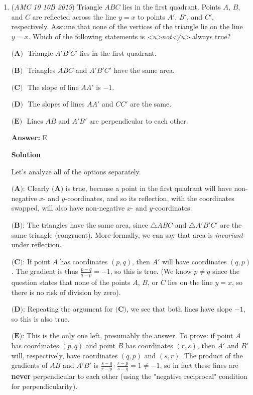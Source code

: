 \begin{enumerate}
 


	\item (\textit{AMC 10 10B 2019}) Triangle $ABC$ lies in the first quadrant. Points $A$, $B$, and $C$ are reflected across the line $y=x$ to points $A'$, $B'$, and $C'$, respectively. Assume that none of the vertices of the triangle lie on the line $y=x$. Which of the following statements is \textit{<u>not</u>} always true?


 $\textbf{(A) }$ Triangle $A'B'C'$ lies in the first quadrant.


 $\textbf{(B) }$ Triangles $ABC$ and $A'B'C'$ have the same area.


 $\textbf{(C) }$ The slope of line $AA'$ is $-1$.


 $\textbf{(D) }$ The slopes of lines $AA'$ and $CC'$ are the same.


 $\textbf{(E) }$ Lines $AB$ and $A'B'$ are perpendicular to each other.


 
 \textbf{Answer: }E



\textbf{Solution}

Let's analyze all of the options separately. 

 $\textbf{(A)}$: Clearly $\textbf{(A)}$ is true, because a point in the first quadrant will have non-negative $x$- and $y$-coordinates, and so its reflection, with the coordinates swapped, will also have non-negative $x$- and $y$-coordinates.

 $\textbf{(B)}$: The triangles have the same area, since $\triangle ABC$ and $\triangle A'B'C'$ are the same triangle (congruent). More formally, we can say that area is \textit{invariant} under reflection.

 $\textbf{(C)}$: If point $A$ has coordinates $(p,q)$, then $A'$ will have coordinates $(q,p)$. The gradient is thus $\frac{p-q}{q-p} = -1$, so this is true. (We know $p \neq q$ since the question states that none of the points $A$, $B$, or $C$ lies on the line $y=x$, so there is no risk of division by zero).

 $\textbf{(D)}$: Repeating the argument for $\textbf{(C)}$, we see that both lines have slope $-1$, so this is also true.

 $\textbf{(E)}$: This is the only one left, presumably the answer. To prove: if point $A$ has coordinates $(p,q)$ and point $B$ has coordinates $(r,s)$, then $A'$ and $B'$ will, respectively, have coordinates $(q,p)$ and $(s,r)$. The product of the gradients of $AB$ and $A'B'$ is $\frac{s-q}{r-p} \cdot \frac{r-p}{s-q} = 1 \neq -1$, so in fact these lines are \textbf{never} perpendicular to each other (using the "negative reciprocal" condition for perpendicularity).


\end{enumerate}

